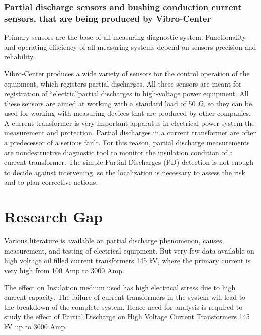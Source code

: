\subsubsection{Partial discharge sensors and bushing conduction current sensors, that are being produced by Vibro-Center}
Primary sensors are the base of all measuring diagnostic system. Functionality and operating efficiency of all measuring systems depend on sensors precision and reliability.

Vibro-Center produces a wide variety of sensors for the control operation of the equipment, which registers partial discharges. All these sensors are meant for registration of \textquotedblleft electric\textquotedblright partial discharges in high-voltage power equipment. All these sensors are aimed at working with a standard load of 50 $\Omega$, so they can be used for working with measuring devices that are produced by other companies. A current transformer is very important apparatus in electrical power system the measurement and protection. Partial discharges in a current transformer are often a predecessor of a serious fault. For this reason, partial discharge measurements are nondestructive diagnostic tool to monitor the insulation condition of a current transformer. The simple Partial Discharges (PD) detection is not enough to decide against intervening, so the localization is necessary to assess the risk and to plan corrective actions.

\pagebreak 
\section{Research Gap}
Various literature is available on partial discharge phenomenon, causes, measurement, and testing of electrical equipment. But very few data available on high voltage oil filled current transformers 145 kV, where the primary current is very high from 100 Amp to 3000 Amp\setlength{\parskip}{1em}.
 
The effect on Insulation medium used has high electrical stress due to high current capacity. The failure of current transformers in the system will lead to the breakdown of the complete system. Hence need for analysis is required to study the effect of Partial Discharge on High Voltage Current Transformers 145 kV up to 3000 Amp.

